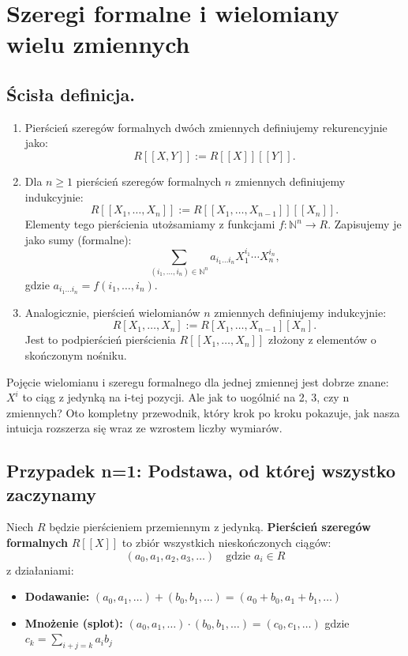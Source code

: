 \section{Szeregi formalne i wielomiany wielu zmiennych}

\subsection{Ścisła definicja.}

\begin{definition}
    \begin{enumerate}[label=\arabic*)]
        \item Pierścień szeregów formalnych dwóch zmiennych definiujemy rekurencyjnie jako:
        \[
        R[[X,Y]] := R[[X]][[Y]].
        \]

        \item Dla $n \ge 1$ pierścień szeregów formalnych $n$ zmiennych definiujemy indukcyjnie:
        \[
        R[[X_1,\dots,X_n]] := R[[X_1,\dots,X_{n-1}]][[X_n]].
        \]
        Elementy tego pierścienia utożsamiamy z funkcjami $f \colon \mathbb{N}^n \to R$. 
        Zapisujemy je jako sumy (formalne):
        \[
        \sum_{(i_1,\dots,i_n)\in\mathbb{N}^n} a_{i_1\dots i_n}X_1^{i_1}\cdots X_n^{i_n},
        \]
        gdzie $a_{i_1\dots i_n}=f(i_1,\dots,i_n)$.

        \item Analogicznie, pierścień wielomianów $n$ zmiennych definiujemy indukcyjnie:
        \[
        R[X_1,\dots,X_n] := R[X_1,\dots,X_{n-1}][X_n].
        \]
        Jest to podpierścień pierścienia $R[[X_1,\dots,X_n]]$ złożony z elementów o skończonym nośniku.
    \end{enumerate}
\end{definition}

Pojęcie wielomianu i szeregu formalnego dla jednej zmiennej jest dobrze znane: $X^i$ to ciąg z jedynką na i-tej pozycji. Ale jak to uogólnić na 2, 3, czy n zmiennych? Oto kompletny przewodnik, który krok po kroku pokazuje, jak nasza intuicja rozszerza się wraz ze wzrostem liczby wymiarów.

\subsection{Przypadek n=1: Podstawa, od której wszystko zaczynamy}

\begin{definition}
Niech $R$ będzie pierścieniem przemiennym z jedynką. \textbf{Pierścień szeregów formalnych} $R[[X]]$ to zbiór wszystkich nieskończonych ciągów:
\[
(a_0, a_1, a_2, a_3, \dots) \quad \text{gdzie } a_i \in R
\]
z działaniami:
\begin{itemize}
    \item \textbf{Dodawanie:} $(a_0, a_1, \dots) + (b_0, b_1, \dots) = (a_0+b_0, a_1+b_1, \dots)$
    \item \textbf{Mnożenie (splot):} $(a_0, a_1, \dots) \cdot (b_0, b_1, \dots) = (c_0, c_1, \dots)$ gdzie $c_k = \sum_{i+j=k} a_i b_j$
\end{itemize}
\end{definition}

